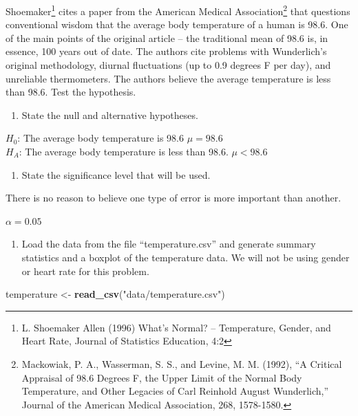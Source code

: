 \documentclass[
]{book}
\newenvironment{Shaded}{\begin{snugshade}}{\end{snugshade}}
\newcommand{\KeywordTok}[1]{\textcolor[rgb]{0.13,0.29,0.53}{\textbf{#1}}}
\newcommand{\NormalTok}[1]{#1}
\newcommand{\StringTok}[1]{\textcolor[rgb]{0.31,0.60,0.02}{#1}}
\providecommand{\tightlist}{%
  \setlength{\itemsep}{0pt}\setlength{\parskip}{0pt}}
\begin{document}
Shoemaker\footnote{L. Shoemaker Allen (1996) What's Normal? -- Temperature, Gender, and Heart Rate, Journal of Statistics Education, 4:2} cites a paper from the American Medical Association\footnote{Mackowiak, P. A., Wasserman, S. S., and Levine, M. M. (1992), ``A Critical Appraisal of 98.6 Degrees F, the Upper Limit of the Normal Body Temperature, and Other Legacies of Carl Reinhold August Wunderlich,'' Journal of the American Medical Association, 268, 1578-1580.} that questions conventional wisdom that the average body temperature of a human is 98.6. One of the main points of the original article -- the traditional mean of 98.6 is, in essence, 100 years out of date. The authors cite problems with Wunderlich's original methodology, diurnal fluctuations (up to 0.9 degrees F per day), and unreliable thermometers. The authors believe the average temperature is less than 98.6. Test the hypothesis.

\begin{enumerate}
\def\labelenumi{\alph{enumi}.}
\tightlist
\item
  State the null and alternative hypotheses.
\end{enumerate}

\(H_0\): The average body temperature is 98.6 \(\mu = 98.6\)\\
\(H_A\): The average body temperature is less than 98.6. \(\mu < 98.6\)

\begin{enumerate}
\def\labelenumi{\alph{enumi}.}
\setcounter{enumi}{1}
\tightlist
\item
  State the significance level that will be used.
\end{enumerate}

There is no reason to believe one type of error is more important than another.

\(\alpha = 0.05\)

\begin{enumerate}
\def\labelenumi{\alph{enumi}.}
\setcounter{enumi}{2}
\tightlist
\item
  Load the data from the file ``temperature.csv'' and generate summary statistics and a boxplot of the temperature data. We will not be using gender or heart rate for this problem.
\end{enumerate}

\begin{Shaded}
\begin{Highlighting}[]
\NormalTok{temperature <-}\StringTok{ }\KeywordTok{read_csv}\NormalTok{(}\StringTok{"data/temperature.csv"}\NormalTok{)}
\end{Highlighting}
\end{Shaded}
\end{document}
